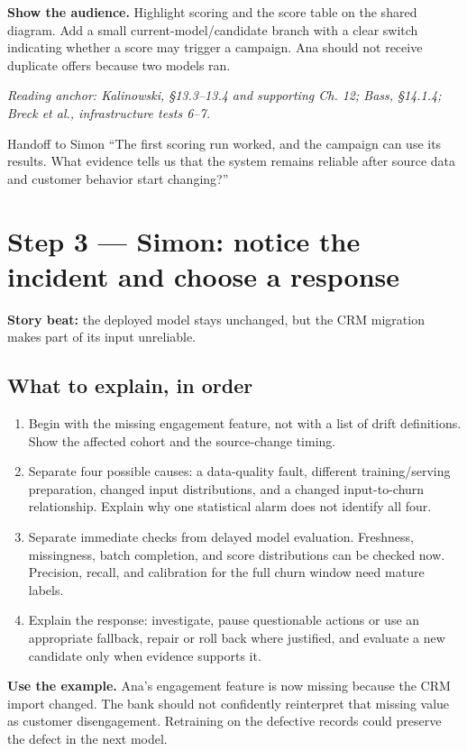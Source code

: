 \documentclass[12pt,a4paper]{article}
\newcommand{\source}[1]{\par\textcolor{teal!70!black}{\textit{Reading anchor: #1}}\par}
\begin{document}
\textbf{Show the audience.} Highlight scoring and the score table on the shared diagram. Add a small current-model/candidate branch with a clear switch indicating whether a score may trigger a campaign. Ana should not receive duplicate offers because two models ran.

\source{Kalinowski, \S13.3--13.4 and supporting Ch. 12; Bass, \S14.1.4; Breck et al., infrastructure tests 6--7.}

\begin{handoffbox}{Handoff to Simon}
``The first scoring run worked, and the campaign can use its results. What evidence tells us that the system remains reliable after source data and customer behavior start changing?''
\end{handoffbox}

\section{Step 3 --- Simon: notice the incident and choose a response}
\textbf{Story beat:} the deployed model stays unchanged, but the CRM migration makes part of its input unreliable.

\subsection{What to explain, in order}
\begin{enumerate}
\item Begin with the missing engagement feature, not with a list of drift definitions. Show the affected cohort and the source-change timing.
\item Separate four possible causes: a data-quality fault, different training/serving preparation, changed input distributions, and a changed input-to-churn relationship. Explain why one statistical alarm does not identify all four.
\item Separate immediate checks from delayed model evaluation. Freshness, missingness, batch completion, and score distributions can be checked now. Precision, recall, and calibration for the full churn window need mature labels.
\item Explain the response: investigate, pause questionable actions or use an appropriate fallback, repair or roll back where justified, and evaluate a new candidate only when evidence supports it.
\end{enumerate}

\textbf{Use the example.} Ana's engagement feature is now missing because the CRM import changed. The bank should not confidently reinterpret that missing value as customer disengagement. Retraining on the defective records could preserve the defect in the next model.
\end{document}
